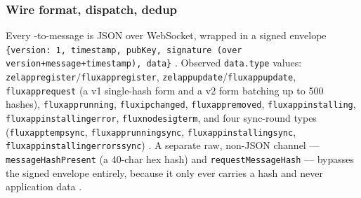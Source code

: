 \subsubsection{Wire format, dispatch, dedup}
Every \FluxOS-to-\FluxOS message is JSON over WebSocket, wrapped in a signed envelope
\texttt{\{version:\,\allowbreak{}1,\allowbreak{} timestamp,\allowbreak{} pubKey,\allowbreak{} signature (over version+message+timestamp),\allowbreak{} data\}}
. Observed
\texttt{data.type} values: \texttt{zelappregister}\slash\texttt{fluxappregister},
\texttt{zelappupdate}\slash\texttt{fluxappupdate}, \texttt{fluxapprequest} (a v1 single-hash form and a
v2 form batching up to 500 hashes), \texttt{fluxapprunning}, \texttt{fluxipchanged},
\texttt{fluxappremoved}, \texttt{fluxappinstalling}, \texttt{fluxappinstallingerror},
\texttt{fluxnodesigterm}, and four sync-round types
(\texttt{fluxapptempsync}, \texttt{fluxapprunningsync}, \texttt{fluxappinstallingsync},
\texttt{fluxappinstallingerrorssync}) 
. A separate raw,
non-JSON channel — \texttt{message\allowbreak{}Hash\allowbreak{}Present} (a 40-char hex hash) and
\texttt{request\allowbreak{}Message\allowbreak{}Hash} — bypasses the signed envelope entirely, because it only ever carries a
hash and never application data .

